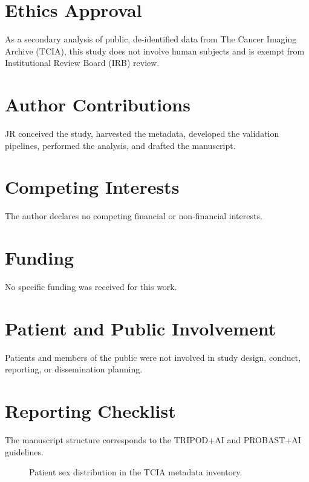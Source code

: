 \documentclass[11pt]{article}
\begin{document}
\section*{Ethics Approval}
As a secondary analysis of public, de-identified data from The Cancer Imaging Archive (TCIA), this study does not involve human subjects and is exempt from Institutional Review Board (IRB) review.

\section*{Author Contributions}
JR conceived the study, harvested the metadata, developed the validation pipelines, performed the analysis, and drafted the manuscript.

\section*{Competing Interests}
The author declares no competing financial or non-financial interests.

\section*{Funding}
No specific funding was received for this work.

\section*{Patient and Public Involvement}
Patients and members of the public were not involved in study design, conduct, reporting, or dissemination planning.

\section*{Reporting Checklist}
The manuscript structure corresponds to the TRIPOD+AI and PROBAST+AI guidelines.

\begin{figure}[H]
\centering
{}
\caption{Patient sex distribution in the TCIA metadata inventory.}
\end{figure}
\end{document}

